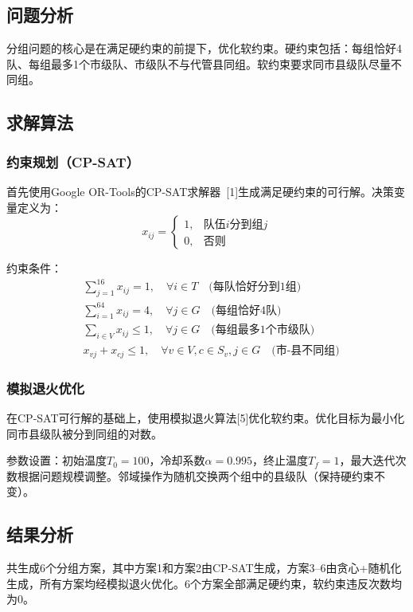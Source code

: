 \documentclass[a4paper,12pt]{article}
\begin{document}
\subsection{问题分析}
分组问题的核心是在满足硬约束的前提下，优化软约束。硬约束包括：每组恰好4队、每组最多1个市级队、市级队不与代管县同组。软约束要求同市县级队尽量不同组。

\subsection{求解算法}

\subsubsection{约束规划（CP-SAT）}
首先使用Google OR-Tools的CP-SAT求解器~[1]生成满足硬约束的可行解。决策变量定义为：
\[
x_{ij} = \begin{cases} 1, & \text{队伍}i\text{分到组}j \\ 0, & \text{否则} \end{cases}
\]

约束条件：
\begin{align}
& \sum_{j=1}^{16} x_{ij} = 1, \quad \forall i \in T \quad \text{(每队恰好分到1组)} \\
& \sum_{i=1}^{64} x_{ij} = 4, \quad \forall j \in G \quad \text{(每组恰好4队)} \\
& \sum_{i \in V} x_{ij} \leq 1, \quad \forall j \in G \quad \text{(每组最多1个市级队)} \\
& x_{vj} + x_{cj} \leq 1, \quad \forall v \in V, c \in S_v, j \in G \quad \text{(市-县不同组)}
\end{align}

\subsubsection{模拟退火优化}
在CP-SAT可行解的基础上，使用模拟退火算法[5]优化软约束。优化目标为最小化同市县级队被分到同组的对数。

参数设置：初始温度$T_0=100$，冷却系数$\alpha=0.995$，终止温度$T_f=1$，最大迭代次数根据问题规模调整。邻域操作为随机交换两个组中的县级队（保持硬约束不变）。

\subsection{结果分析}
共生成6个分组方案，其中方案1和方案2由CP-SAT生成，方案3--6由贪心+随机化生成，所有方案均经模拟退火优化。6个方案全部满足硬约束，软约束违反次数均为0。
\end{document}
